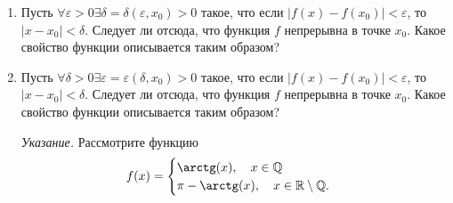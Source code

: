 \documentclass[12pt]{article}
\begin{document}
\begin{enumerate}
		\item Пусть $\forall\varepsilon>0$\quad $\exists\delta=\delta(\varepsilon,x_0)>0$ такое, что если $|f(x)-f(x_0)|<\varepsilon$, то $|x-x_0|<\delta$. Следует ли отсюда, что функция $f$ непрерывна в точке $x_0$. Какое свойство функции описывается таким образом?
		
		\item Пусть $\forall\delta>0$\quad $\exists\varepsilon=\varepsilon(\delta,x_0)>0$ такое, что если $|f(x)-f(x_0)|<\varepsilon$, то $|x-x_0|<\delta$. Следует ли отсюда, что функция $f$ непрерывна в точке $x_0$. Какое свойство функции описывается таким образом?
		
		\textit{Указание.} Рассмотрите функцию
		$$
		f(x)=
		\begin{cases}
			\arctg(x),\quad x\in\mathbb{Q}\\
			\pi-\arctg(x),\quad x\in\mathbb{R}\setminus\mathbb{Q}.
		\end{cases}
		$$
		
	\end{enumerate}
\end{document}
